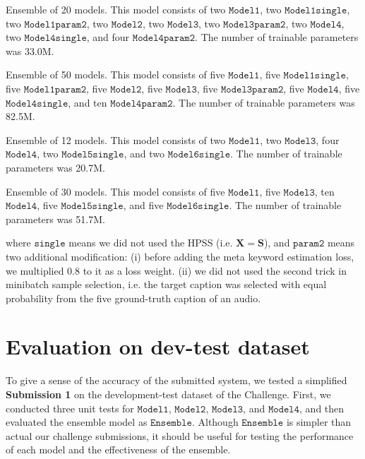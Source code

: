 \documentclass{article}
\begin{document}
\begin{sloppy}
\begin{description}
 \setlength{\parskip}{0cm} 
 \setlength{\itemsep}{0.1cm} 
\item[Submission 1] Ensemble of 20 models. This model consists of
two $\mathtt{Model1}$,
two $\mathtt{Model1single}$,
two $\mathtt{Model1param2}$,
two $\mathtt{Model2}$,
two $\mathtt{Model3}$,
two $\mathtt{Model3param2}$,
two $\mathtt{Model4}$, 
two $\mathtt{Model4single}$, and 
four $\mathtt{Model4param2}$.
The number of trainable parameters was 33.0M.
\item[Submission 2] Ensemble of 50 models. This model consists of
five $\mathtt{Model1}$,
five $\mathtt{Model1single}$,
five $\mathtt{Model1param2}$,
five $\mathtt{Model2}$,
five $\mathtt{Model3}$,
five $\mathtt{Model3param2}$,
five $\mathtt{Model4}$, 
five $\mathtt{Model4single}$, and 
ten $\mathtt{Model4param2}$.
The number of trainable parameters was 82.5M.
\item[Submission 3] Ensemble of 12 models. This model consists of
two $\mathtt{Model1}$,
two $\mathtt{Model3}$,
four $\mathtt{Model4}$, 
two $\mathtt{Model5single}$, and 
two $\mathtt{Model6single}$.
The number of trainable parameters was 20.7M.
\item[Submission 4] Ensemble of 30 models. This model consists of
five $\mathtt{Model1}$,
five $\mathtt{Model3}$,
ten $\mathtt{Model4}$, 
five $\mathtt{Model5single}$, and 
five $\mathtt{Model6single}$.
The number of trainable parameters was 51.7M.
\end{description}
where $\mathtt{single}$ means we did not used the HPSS (i.e. $\bm{X} =\bm{S}$),
and $\mathtt{param2}$ means two additional modification: 
(i) before adding the meta keyword estimation loss, we multiplied 0.8 to it as a loss weight.
(ii) we did not used the second trick in minibatch sample selection, i.e. the target caption was selected with equal probability from the five ground-truth caption of an audio.


\section{Evaluation on dev-test dataset}

To give a sense of the accuracy of the submitted system, we tested a simplified {\bf Submission 1} on the development-test dataset of the Challenge.
First, we conducted three unit tests for $\mathtt{Model1}$, $\mathtt{Model2}$, $\mathtt{Model3}$, and $\mathtt{Model4}$, and then evaluated the ensemble model as $\mathtt{Ensemble}$.
Although $\mathtt{Ensemble}$ is simpler than actual our challenge submissions, it should be useful for testing the performance of each model and the effectiveness of the ensemble.


\end{sloppy}
\end{document}

